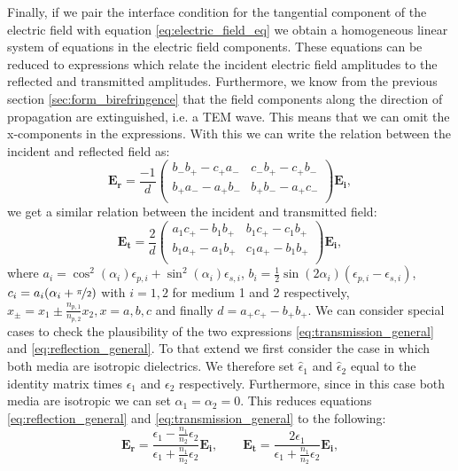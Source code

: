 Finally, if we pair the interface condition for the tangential component of the electric field with equation \ref{eq:electric_field_eq} we obtain a homogeneous linear system of equations in the electric field components. These equations can be reduced to expressions which relate the incident electric field amplitudes to the reflected and transmitted amplitudes. Furthermore, we know from the previous section \ref{sec:form_birefringence} that the field components along the direction of propagation are extinguished, i.e. a TEM wave. This means that we can omit the x-components in the expressions. With this we can write the relation between the incident and reflected field as:
\begin{equation}
    \label{eq:reflection_general}
    \bm{E_r} =
    \frac{-1}{d}
    \begin{pmatrix}
        b_-b_+ - c_+a_- & c_-b_+ - c_+b_- \\
        b_+a_- - a_+b_- & b_+b_- - a_+c_- \\
    \end{pmatrix}
    \bm{E_i},
\end{equation}
we get a similar relation between the incident and transmitted field:
\begin{equation}
    \label{eq:transmission_general}
    \bm{E_t} =
    \frac{2}{d}
    \begin{pmatrix}
        a_1c_+ - b_1b_+ & b_1c_+ - c_1b_+ \\
        b_1a_+ - a_1b_+ & c_1a_+ - b_1b_+ \\
    \end{pmatrix}
    \bm{E_i},
\end{equation}
where $a_i=\cos^2(\alpha_i)\epsilon_{p,i}+\sin^2(\alpha_i)\epsilon_{s,i}$, $b_i=\frac{1}{2}\sin(2\alpha_i)(\epsilon_{p,i}-\epsilon_{s,i})$, $c_i = a_i(\alpha_i + \nicefrac{\pi}{2})$ with $i=1,2$ for medium 1 and 2 respectively, $x_{\pm}=x_1\pm \frac{n_{p,1}}{n_{p,2}} x_2, x=a,b,c$ and finally $d=a_+c_+-b_+b_+$. We can consider special cases to check the plausibility of the two expressions \ref{eq:transmission_general} and \ref{eq:reflection_general}. To that extend we first consider the case in which both media are isotropic dielectrics. We therefore set $\hat{\epsilon}_1$ and $\hat{\epsilon}_2$ equal to the identity matrix times $\epsilon_1$ and $\epsilon_2$ respectively. Furthermore, since in this case both media are isotropic we can set $\alpha_1 = \alpha_2 = 0$. This reduces equations \ref{eq:reflection_general} and \ref{eq:transmission_general} to the following:
\begin{equation}
    \bm{E_r} = \frac{\epsilon_1-\frac{n_1}{n_2}\epsilon_2}{\epsilon_1+\frac{n_1}{n_2}\epsilon_2}\bm{E_i}, \qquad \bm{E_t} = \frac{2\epsilon_1}{\epsilon_1+\frac{n_1}{n_2}\epsilon_2}\bm{E_i},
\end{equation}
